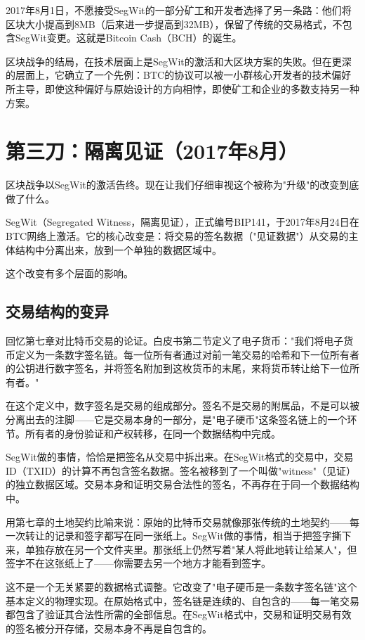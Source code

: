 \documentclass[a4paper,12pt,openany]{ctexbook}
\begin{document}
2017年8月1日，不愿接受SegWit的一部分矿工和开发者选择了另一条路：他们将区块大小提高到8MB（后来进一步提高到32MB），保留了传统的交易格式，不包含SegWit变更。这就是Bitcoin Cash（BCH）的诞生。

区块战争的结局，在技术层面上是SegWit的激活和大区块方案的失败。但在更深的层面上，它确立了一个先例：BTC的协议可以被一小群核心开发者的技术偏好所主导，即使这种偏好与原始设计的方向相悖，即使矿工和企业的多数支持另一种方案。


\section*{第三刀：隔离见证（2017年8月）}


区块战争以SegWit的激活告终。现在让我们仔细审视这个被称为"升级"的改变到底做了什么。

SegWit（Segregated Witness，隔离见证），正式编号BIP141，于2017年8月24日在BTC网络上激活。它的核心改变是：将交易的签名数据（"见证数据"）从交易的主体结构中分离出来，放到一个单独的数据区域中。

这个改变有多个层面的影响。


\subsection*{交易结构的变异}


回忆第七章对比特币交易的论证。白皮书第二节定义了电子货币："我们将电子货币定义为一条数字签名链。每一位所有者通过对前一笔交易的哈希和下一位所有者的公钥进行数字签名，并将签名附加到这枚货币的末尾，来将货币转让给下一位所有者。"

在这个定义中，数字签名是交易的组成部分。签名不是交易的附属品，不是可以被分离出去的注脚——它是交易本身的一部分，是"电子硬币"这条签名链上的一个环节。所有者的身份验证和产权转移，在同一个数据结构中完成。

SegWit做的事情，恰恰是把签名从交易中拆出来。在SegWit格式的交易中，交易ID（TXID）的计算不再包含签名数据。签名被移到了一个叫做"witness"（见证）的独立数据区域。交易本身和证明交易合法性的签名，不再存在于同一个数据结构中。

用第七章的土地契约比喻来说：原始的比特币交易就像那张传统的土地契约——每一次转让的记录和签字都写在同一张纸上。SegWit做的事情，相当于把签字撕下来，单独存放在另一个文件夹里。那张纸上仍然写着"某人将此地转让给某人"，但签字不在这张纸上了——你需要去另一个地方才能看到签字。

这不是一个无关紧要的数据格式调整。它改变了"电子硬币是一条数字签名链"这个基本定义的物理实现。在原始格式中，签名链是连续的、自包含的——每一笔交易都包含了验证其合法性所需的全部信息。在SegWit格式中，交易和证明交易有效的签名被分开存储，交易本身不再是自包含的。
\end{document}
